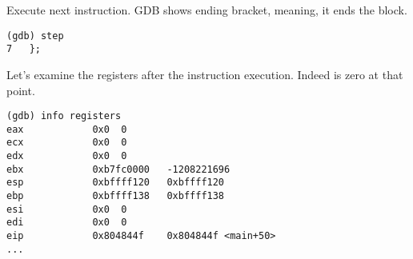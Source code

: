 Execute next instruction.
\ac{GDB} shows ending bracket, meaning, it ends the block.

\begin{lstlisting}
(gdb) step
7	};
\end{lstlisting}

Let's examine the registers after the  instruction execution.
Indeed \EAX is zero at that point.

\begin{lstlisting}
(gdb) info registers
eax            0x0	0
ecx            0x0	0
edx            0x0	0
ebx            0xb7fc0000	-1208221696
esp            0xbffff120	0xbffff120
ebp            0xbffff138	0xbffff138
esi            0x0	0
edi            0x0	0
eip            0x804844f	0x804844f <main+50>
...
\end{lstlisting}

